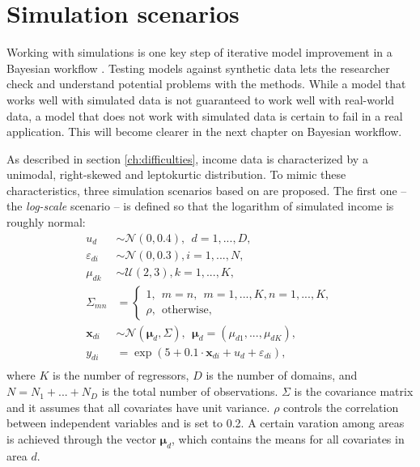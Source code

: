 \section{Simulation scenarios}
\label{ch:simulations}
Working with simulations is one key step of iterative model improvement in a Bayesian workflow \citep{gelman_bayesian_2020}.
Testing models against synthetic data lets the researcher check and understand potential problems with the methods.
While a model that works well with simulated data is not guaranteed to work well with real-world data,
a model that does not work with simulated data is certain to fail in a real application.
This will become clearer in the next chapter on Bayesian workflow.

As described in section \ref{ch:difficulties}, income data is characterized by a unimodal, right-skewed and leptokurtic distribution.
To mimic these characteristics, three simulation scenarios based on \cite{rojas_perilla_data_2020} are proposed.
The first one – the \textit{log-scale} scenario – is defined so that the logarithm of simulated income is roughly normal:
\begin{equation}
    \begin{split}
        u_d & \sim \mathcal N(0, 0.4), ~~ d = 1,...,D,\\
        \varepsilon_{di} & \sim \mathcal{N}(0, 0.3), i = 1,...,N,\\
        \mu_{dk} & \sim \mathcal{U}(2, 3), k = 1,...,K,\\
        \Sigma_{mn} & = \begin{cases} 1, ~~ m = n,~~m = 1,...,K, n = 1,...,K, \\ \rho,  ~~ \text{otherwise},  \end{cases}
            \\
        \boldsymbol x_{di}  &\sim \mathcal N (\boldsymbol \mu_{d}, \Sigma) ,
            ~~ \boldsymbol \mu_{d} = (\mu_{d1}, ..., \mu_{dK}),\\
        y_{di} & = \exp(5 + 0.1 \cdot \boldsymbol x_{di}  + u_d + \varepsilon_{di}),\\
    \end{split}
    \label{eq:log_scenario}
\end{equation}
where $K$ is the number of regressors, $D$ is the number of domains, and $N = N_1 + ... + N_D$ is the total number of observations.
$\Sigma$ is the covariance matrix and it assumes that all covariates have unit variance. $\rho$ controls the correlation between independent variables and is set to 0.2.
A certain varation among areas is achieved through the vector $\boldsymbol \mu_d$, which contains the means for all covariates in area $d$.
